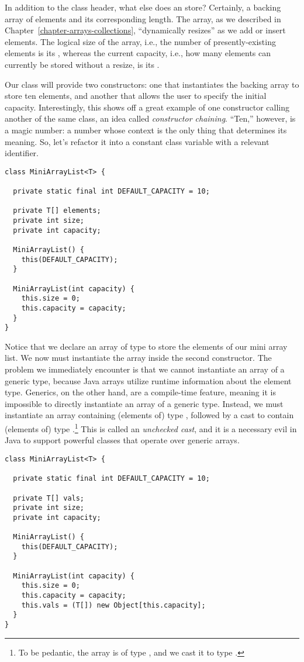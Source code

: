 In addition to the class header, what else does an  store? 
Certainly, a backing array of elements and its corresponding length. 
The array, as we described in Chapter~\ref{chapter-arrays-collections}, ``dynamically resizes'' as we add or insert elements. 
The logical size of the array, i.e., the number of presently-existing elements is its , whereas the current capacity, i.e., how many elements can currently be stored without a resize, is its . 

Our class will provide two constructors: one that instantiates the backing array to store ten elements, and another that allows the user to specify the initial capacity. 
Interestingly, this shows off a great example of one constructor calling another of the same class, an idea called \emph{constructor chaining}. 
``Ten,'' however, is a magic number: a number whose context is the only thing that determines its meaning. 
So, let's refactor it into a constant class variable with a relevant identifier.

\begin{lstlisting}[language=MyJava]
class MiniArrayList<T> {

  private static final int DEFAULT_CAPACITY = 10;

  private T[] elements;
  private int size;
  private int capacity;

  MiniArrayList() { 
    this(DEFAULT_CAPACITY); 
  }

  MiniArrayList(int capacity) {
    this.size = 0;
    this.capacity = capacity;
  }
}
\end{lstlisting}

Notice that we declare an array of type  to store the elements of our mini array list. 
We now must instantiate the array inside the second constructor. 
The problem we immediately encounter is that we cannot instantiate an array of a generic type, because Java arrays utilize runtime information about the element type. 
Generics, on the other hand, are a compile-time feature, meaning it is impossible to directly instantiate an array of a generic type. 
Instead, we must instantiate an array containing (elements of) type , followed by a cast to contain (elements of) type .\footnote{To be pedantic, the array is of type , and we cast it to type .} 
This is called an \emph{unchecked cast}, and it is a necessary evil in Java to support powerful classes that operate over generic arrays.

\enlargethispage{-2\baselineskip}
\begin{lstlisting}[language=MyJava]
class MiniArrayList<T> {

  private static final int DEFAULT_CAPACITY = 10;

  private T[] vals;
  private int size;
  private int capacity;

  MiniArrayList() { 
    this(DEFAULT_CAPACITY); 
  }

  MiniArrayList(int capacity) {
    this.size = 0;
    this.capacity = capacity;
    this.vals = (T[]) new Object[this.capacity];
  }
}
\end{lstlisting}

